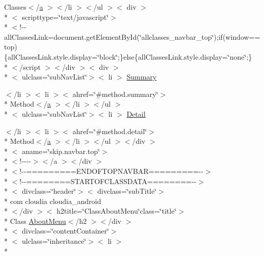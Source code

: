 \begin{DoxyCompactItemize}
\item 
Classes$<$/\hyperlink{style_8css_a5e8981582017bb8b84c21f148345d1f7}{a} $>$$<$/li $>$$<$/ul $>$$<$ div $>$\\*
$<$ scripttype=\char`\"{}text/javascript\char`\"{}$>$\\*
$<$!-\/-\/all\-Classes\-Link=document.\-get\-Element\-By\-Id(\char`\"{}allclasses\-\_\-navbar\-\_\-top\char`\"{});if(window==top)\{all\-Classes\-Link.\-style.\-display=\char`\"{}block\char`\"{};\}else\{all\-Classes\-Link.\-style.\-display=\char`\"{}none\char`\"{};\}\\*
$<$/script $>$$<$/div $>$$<$ div $>$\\*
$<$ ulclass=\char`\"{}sub\-Nav\-List\char`\"{}$>$$<$ li $>$ \hyperlink{_about_menu_8html_a6f9ab45abc9b0679dc1b132fbacfc681}{Summary}
\item 
$<$/li $>$$<$ li $>$$<$ ahref=\char`\"{}\#method.\-summary\char`\"{}$>$\\*
 Method$<$/\hyperlink{style_8css_a5e8981582017bb8b84c21f148345d1f7}{a} $>$$<$/li $>$$<$/ul $>$\\*
$<$ ulclass=\char`\"{}sub\-Nav\-List\char`\"{}$>$$<$ li $>$ \hyperlink{_about_menu_8html_a1e04b5ec07bcd5281e26dcd40e5b3a94}{Detail}
\item 
$<$/li $>$$<$ li $>$$<$ ahref=\char`\"{}\#method.\-detail\char`\"{}$>$\\*
 Method$<$/\hyperlink{style_8css_a5e8981582017bb8b84c21f148345d1f7}{a} $>$$<$/li $>$$<$/ul $>$$<$/div $>$\\*
$<$ aname=\char`\"{}skip.\-navbar.\-top\char`\"{}$>$\\*
$<$!-\/-\/-\/-\/$>$$<$/a $>$$<$/div $>$\\*
$<$!-\/-\/=========E\-N\-D\-O\-F\-T\-O\-P\-N\-A\-V\-B\-A\-R=========-\/-\/$>$\\*
$<$!-\/-\/========S\-T\-A\-R\-T\-O\-F\-C\-L\-A\-S\-S\-D\-A\-T\-A========-\/-\/$>$\\*
$<$ divclass=\char`\"{}header\char`\"{}$>$$<$ divclass=\char`\"{}sub\-Title\char`\"{}$>$\\*
 com cloudia cloudia\-\_\-android\\*
$<$/div $>$$<$ h2title=\char`\"{}Class\-About\-Menu\char`\"{}class=\char`\"{}title\char`\"{}$>$\\*
 Class \hyperlink{index-1_8html_a162bfbb70b33688ca3d6f9b372dd6e4b}{About\-Menu}$<$/h2 $>$$<$/div $>$\\*
$<$ divclass=\char`\"{}content\-Container\char`\"{}$>$\\*
$<$ ulclass=\char`\"{}inheritance\char`\"{}$>$$<$ li $>$\\*

\end{DoxyCompactItemize}

